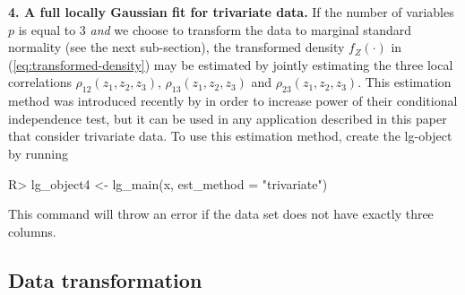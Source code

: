\textbf{4. A full locally Gaussian fit for trivariate data.} If the number of variables $p$ is equal to $3$ \emph{and} we choose to transform the data to marginal standard normality (see the next sub-section), the transformed density $f_Z(\cdot)$ in (\ref{eq:transformed-density}) may be estimated by jointly estimating the three local correlations $\rho_{12}(z_1, z_2, z_3)$, $\rho_{13}(z_1, z_2, z_3)$ and $\rho_{23}(z_1, z_2, z_3)$. This estimation method was introduced recently by \citet{otne:tjos:2019} in order to increase power of their conditional independence test, but it can be used in any application described in this paper that consider trivariate data. To use this estimation method, create the lg-object by running

\begin{example}
R> lg_object4 <- lg_main(x, est_method = "trivariate")
\end{example}
This command will throw an error if the data set  does not have exactly three columns.

\subsection{Data transformation}
\label{data-transformation}

